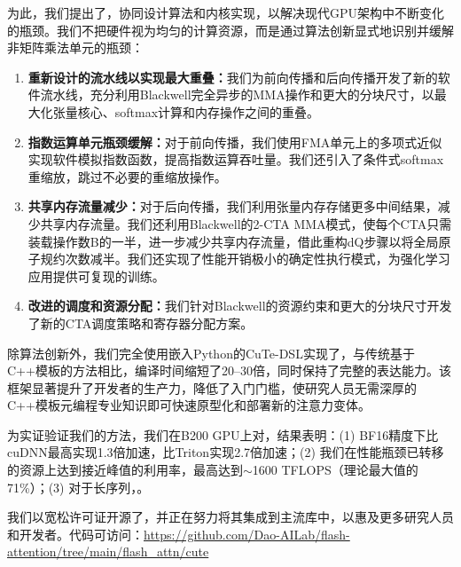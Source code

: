 为此，我们提出了\faf，协同设计算法和内核实现，以解决现代GPU架构中不断变化的瓶颈。我们不把硬件视为均匀的计算资源，而是通过算法创新显式地识别并缓解非矩阵乘法单元的瓶颈：

\begin{enumerate}[itemsep=0pt,topsep=0pt,leftmargin=*]
\item \textbf{重新设计的流水线以实现最大重叠：}我们为前向传播和后向传播开发了新的软件流水线，充分利用Blackwell完全异步的MMA操作和更大的分块尺寸，以最大化张量核心、softmax计算和内存操作之间的重叠。

\item \textbf{指数运算单元瓶颈缓解：}对于前向传播，我们使用FMA单元上的多项式近似实现软件模拟指数函数，提高指数运算吞吐量。我们还引入了条件式softmax重缩放，跳过不必要的重缩放操作。

\item \textbf{共享内存流量减少：}对于后向传播，我们利用张量内存存储更多中间结果，减少共享内存流量。我们还利用Blackwell的2-CTA MMA模式，使每个CTA只需装载操作数B的一半，进一步减少共享内存流量，借此重构dQ步骤以将全局原子规约次数减半。我们还实现了性能开销极小的确定性执行模式，为强化学习应用提供可复现的训练。

\item \textbf{改进的调度和资源分配：}我们针对Blackwell的资源约束和更大的分块尺寸开发了新的CTA调度策略和寄存器分配方案。
\end{enumerate}

除算法创新外，我们完全使用嵌入Python的CuTe-DSL实现了\faf，与传统基于C++模板的方法相比，编译时间缩短了20--30倍，同时保持了完整的表达能力。该框架显著提升了开发者的生产力，降低了入门门槛，使研究人员无需深厚的C++模板元编程专业知识即可快速原型化和部署新的注意力变体。

为实证验证我们的方法，我们在B200 GPU上对，结果表明：(1) BF16精度下比cuDNN最高实现1.3倍加速，比Triton实现2.7倍加速；(2) 我们在性能瓶颈已转移的资源上达到接近峰值的利用率，最高达到$\sim$1600 TFLOPS（理论最大值的71\%）；(3) 对于长序列，。

我们以宽松许可证开源了\faf，并正在努力将其集成到主流库中，以惠及更多研究人员和开发者。代码可访问：\url{https://github.com/Dao-AILab/flash-attention/tree/main/flash_attn/cute}
